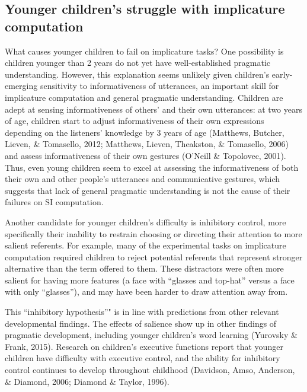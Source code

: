 \documentclass[a4paper,man,apacite,floatsintext]{apa6}
\begin{document}
\subsection{Younger children's struggle with implicature
computation}\label{younger-childrens-struggle-with-implicature-computation}

What causes younger children to fail on implicature tasks? One
possibility is children younger than 2 years do not yet have
well-established pragmatic understanding. However, this explanation
seems unlikely given children's early-emerging sensitivity to
informativeness of utterances, an important skill for implicature
computation and general pragmatic understanding. Children are adept at
sensing informativeness of others' and their own utterances: at two
years of age, children start to adjust informativeness of their own
expressions depending on the listeners' knowledge by 3 years of age
(Matthews, Butcher, Lieven, \& Tomasello, 2012; Matthews, Lieven,
Theakston, \& Tomasello, 2006) and assess informativeness of their own
gestures (O'Neill \& Topolovec, 2001). Thus, even young children seem to
excel at assessing the informativeness of both their own and other
people's utterances and communicative gestures, which suggests that lack
of general pragmatic understanding is not the cause of their failures on
SI computation.

Another candidate for younger children's difficulty is inhibitory
control, more specifically their inability to restrain choosing or
directing their attention to more salient referents. For example, many
of the experimental tasks on implicature computation required children
to reject potential referents that represent stronger alternative than
the term offered to them. These distractors were often more salient for
having more features (a face with ``glasses and top-hat'' versus a face
with only ``glasses''), and may have been harder to draw attention away
from.

This ``inhibitory hypothesis''" is in line with predictions from other
relevant developmental findings. The effects of salience show up in
other findings of pragmatic development, including younger children's
word learning (Yurovsky \& Frank, 2015). Research on children's
executive functions report that younger children have difficulty with
executive control, and the ability for inhibitory control continues to
develop throughout childhood (Davidson, Amso, Anderson, \& Diamond,
2006; Diamond \& Taylor, 1996).
\end{document}
